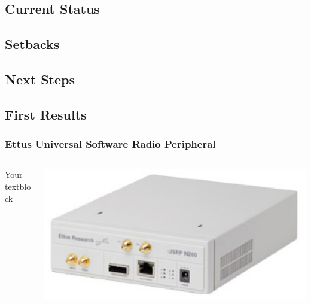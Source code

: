 \documentclass{beamer}
\begin{document}
\subsection{Current Status}

\subsection{Setbacks}

\subsection{Next Steps}

\subsection{First Results}

\begin{frame}
\frametitle{Ettus Universal Software Radio Peripheral}
  \begin{columns}[T]
    \begin{column}{.5\textwidth}
     \begin{block}{Your textblock}
    \end{block}
    \end{column}
    \begin{column}{.5\textwidth}
    \begin{block}{}
    \includegraphics[width=\textwidth]{n200.eps}
    \end{block}
    \end{column}
  \end{columns}
\end{frame}
\end{document}
